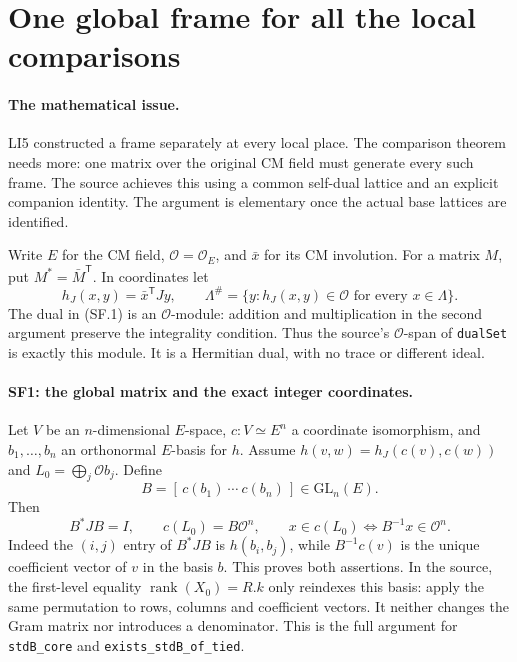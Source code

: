 \section{One global frame for all the local comparisons}
\label{sec:standard-global-frame}


\paragraph{The mathematical issue.}
LI5 constructed a frame separately at every local place. The comparison
theorem needs more: one matrix over the original CM field must generate
every such frame. The source achieves this using a common self-dual lattice
and an explicit companion identity. The argument is elementary once the
actual base lattices are identified.

Write $E$ for the CM field, $\mathcal O=\mathcal O_E$, and
$\bar x$ for its CM involution. For a matrix $M$, put
$M^*=\bar M^{\mathsf T}$. In coordinates let
\[
 h_J(x,y)=\bar x^{\mathsf T}Jy,\qquad
 \Lambda^\#=\{y:h_J(x,y)\in\mathcal O\text{ for every }x\in\Lambda\}.
                                                               \tag{SF.1}
\]
The dual in (SF.1) is an $\mathcal O$-module: addition and multiplication
in the second argument preserve the integrality condition. Thus the
source's $\mathcal O$-span of \texttt{dualSet} is exactly this module.
It is a Hermitian dual, with no trace or different ideal.

\paragraph{SF1: the global matrix and the exact integer coordinates.}
Let $V$ be an $n$-dimensional $E$-space, $c:V\simeq E^n$ a coordinate
isomorphism, and $b_1,\ldots,b_n$ an orthonormal $E$-basis for $h$.
Assume $h(v,w)=h_J(c(v),c(w))$ and
$L_0=\bigoplus_j\mathcal O b_j$. Define
\[
 B=[\,c(b_1)\ \cdots\ c(b_n)\,]\in\mathrm{GL}_n(E).
\]
Then
\[
 \boxed{\ B^*JB=I,\qquad c(L_0)=B\mathcal O^n,\qquad
 x\in c(L_0)\Longleftrightarrow B^{-1}x\in\mathcal O^n.\ }       \tag{SF.2}
\]
Indeed the $(i,j)$ entry of $B^*JB$ is $h(b_i,b_j)$, while
$B^{-1}c(v)$ is the unique coefficient vector of $v$ in the basis $b$.
This proves both assertions. In the source, the first-level equality
$\operatorname{rank}(X_0)=R.k$ only reindexes this basis: apply the same
permutation to rows, columns and coefficient vectors. It neither changes
the Gram matrix nor introduces a denominator. This is the full argument
for \texttt{stdB\_core} and \texttt{exists\_stdB\_of\_tied}.

